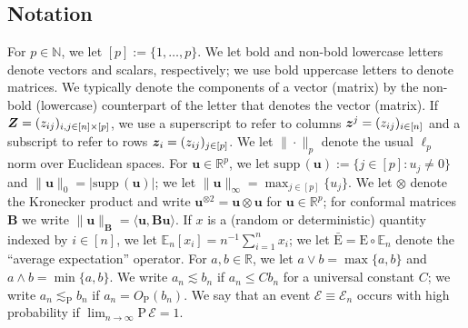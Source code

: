 \documentclass{uwstat572}
\theoremstyle{definition}
\theoremstyle{remark}
\newcommand{\R}{\ensuremath{\mathbb{R}}}
\newcommand{\N}{\mathbb{N}}
\newcommand{\gb}{\beta}
\newcommand{\gep}{\epsilon}
\newcommand{\gs}{\sigma}
\newcommand{\supp}{\mathrm{supp} \,}
\newcommand{\Prb}{\mathrm{P}}
\newcommand{\E}{\mathrm{E}}
\newcommand{\En}{\bar{\E}}
\newcommand{\Ex}{\mathbb{E}}
\newcommand{\Exn}{\Ex_n}
\newcommand{\bs}[1]{\boldsymbol{#1}}
\numberwithin{equation}{section}
\begin{document}
%
\subsection{Notation}
\renewcommand{\d}{\bs{d}}
\newcommand{\dhat}{\hat{\d}}
\newcommand{\dhatc}{\hat{d}}
\newcommand{\dhati}{\dhatc_i}
\newcommand{\db}{\d_{\regb}}
\renewcommand{\u}{\bs{u}}
\newcommand{\x}{\bs{x}}
\newcommand{\y}{\bs{y}}
\newcommand{\U}{\bs{U}}
\newcommand{\inn}{\in[n]}
\newcommand{\event}{\mathcal{E}}
\newcommand{\kp}{\otimes}
\newcommand{\kpt}{\kp2}
\newcommand{\B}{\bs{B}}
\newcommand{\ip}[3]{#3\langle#1,#2 #3\rangle}

For $p\in\N$, we let $[p] := \{1,\ldots,p\}$. We let bold and non-bold lowercase letters denote vectors and scalars, respectively; we use bold uppercase letters to denote matrices. We typically denote the components of a vector (matrix) by the non-bold (lowercase) counterpart of the letter that denotes the vector (matrix). If $\Z = (z_{ij})_{i,j\in[n]\times[p]}$, we use a superscript to refer to columns $\z^j = (z_{ij})_{i\inn}$ and a subscript to refer to rows $\z_i = (z_{ij})_{j\in[p]}$. We let $\|\cdot\|_p$ denote the usual $\ell_p$ norm over Euclidean spaces.  For $\u \in \R^p$, we let $\supp(\u) := \{j\in[p]: u_j \neq 0\}$ and $\|\u\|_0 = |\supp(\u)|$; we let $\|\u\|_\infty = \max_{j\in[p]} \{u_j\}$. We let $\otimes$ denote the Kronecker product and write $\u^{\kpt} = \u \kp \u$ for $\u\in\R^p$; for conformal matrices $\B$ we write $\|\u\|_{\B} = \ip{\u}{\B\u}{}$. If $x$ is a (random or deterministic) quantity indexed by $i\inn$, we let $\Exn[x_i] = n^{-1}\sum_{i=1}^n x_i$; we let $\En = \E\circ\Exn$ denote the ``average expectation'' operator. For $a,b\in\R$, we let $a\vee b = \max\{a,b\}$ and $a\wedge b = \min\{a,b\}$. We write $a_n \lesssim b_n$ if $a_n \leq Cb_n$ for a universal constant $C$; we write $a_n \lesssim_\Prb b_n$ if $a_n = O_\Prb(b_n)$. We say that an event $\event \equiv \event_n$ occurs with high probability if $\lim_{n\to\infty} \Prb \, \event = 1$. 



%


\newcommand{\px}{p_{\x}}
\newcommand{\pu}{p_{\u}}
\newcommand{\pun}{p_{\u,n}}
\newcommand{\regb}{\bs{\gb}}
\newcommand{\regbh}{\hat{\regb}}
\newcommand{\fb}{f_{\regb}}
\newcommand{\fbn}{f_{\regb, n}}
\newcommand{\fbhat}{\hat{\fb}}
\newcommand{\rem}{\bs{r}}
\newcommand{\remc}{r}
\newcommand{\remi}{\remc_i}
\newcommand{\rfb}{r_{\famb}}
\newcommand{\rc}{c_r}
\newcommand{\rb}{r_{\regb}}
\newcommand{\rbn}{r_{\regb,n}}
\newcommand{\rfs}{r_{\fams}}
\newcommand{\Xs}{\mathcal{X}}
\newcommand{\Zs}{\mathcal{Z}}
\newcommand{\Fs}{\mathcal{F}}
\newcommand{\Bs}{\mathcal{B}}
\newcommand{\famb}{\Fs_\Bs}
\newcommand{\fams}{\Fs_\sb}
\newcommand{\Sb}{S}
\newcommand{\Us}{\mathcal{U}}
\renewcommand{\sb}{s}
\newcommand{\gramhat}{\hat{\bs{\Sigma}}}
\newcommand{\tune}{\lambda}
\newcommand{\ersi}{\gep_i}
\newcommand{\sd}{\gs}
\newcommand{\f}{\bs{f}}
\newcommand{\fhat}{\hat{\f}}
\newcommand{\fhc}{\hat{f}}
\newcommand{\ffb}{\bs{f}_{\regb}}
\end{document}
